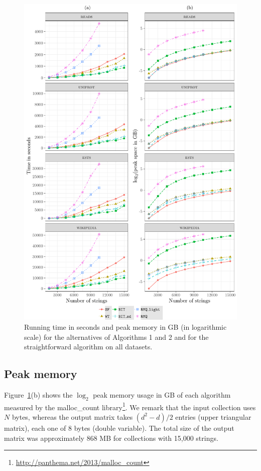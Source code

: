 \documentclass{elsarticle}
\begin{document}
\begin{figure}
 \centering
 \includegraphics[width=1.0\textwidth]{fig_all_with2.pdf}
\caption{Running time in seconds and peak memory in GB (in logarithmic
  scale) for the alternatives of Algorithms 1 and 2 and for the straightforward
  algorithm on all datasets.}
\label{f:all}
\end{figure}





\subsection{Peak memory}\label{s:peak}

Figure~\ref{f:all}(b) shows the $\log_2$ peak memory usage in GB of each
algorithm measured by the malloc\_count
library\footnote{\url{http://panthema.net/2013/malloc\_count}}.
We remark that the
input collection uses $N$ bytes, whereas the output matrix takes
$(d^2-d)/2$ entries (upper triangular matrix), each one of $8$ bytes
(double variable).  The total size of the output matrix was
approximately 868 MB for collections with 15,000 strings.
\end{document}
